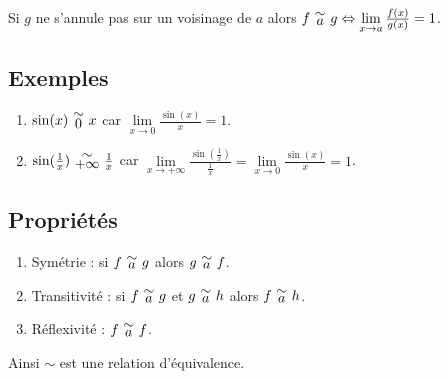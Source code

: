 \documentclass[a4paper,10pt]{book} %
\newcommand{\equi}[1]{\renewcommand{\arraystretch}{0.3}~\begin{matrix}\sim\\#1\end{matrix}~\renewcommand{\arraystretch}{1}}
\begin{document}
Si $g$ ne s'annule pas sur un voisinage de $a$ alors $f\equi{a}g \Leftrightarrow \lim\limits_{x\rightarrow a}\frac{f(x)}{g(x)}=1$.

\subsection{Exemples}
\begin{enumerate}
\item $\sin(x) \equi{0} x$ car $\lim\limits_{x\rightarrow 0} \frac{\sin(x)}{x}=1$.

\item $\sin(\frac{1}{x})\equi{+\infty}\frac{1}{x}$ car $\displaystyle\lim\limits_{x\rightarrow +\infty} \frac{\sin(\frac{1}{x})}{\frac{1}{x}}=\lim\limits_{x\rightarrow 0}\frac{\sin(x)}{x}=1$.
\end{enumerate}

\subsection{Propriétés}
\begin{enumerate}
\item Symétrie : si $f \equi{a} g$ alors $g \equi{a} f$.
\item Transitivité : si $f \equi{a} g$ et $g \equi{a} h$ alors $f \equi{a} h$.
\item Réflexivité : $f \equi{a} f$.
\end{enumerate}
\smallskip
Ainsi $\sim$ est une relation d'équivalence.
\end{document}
